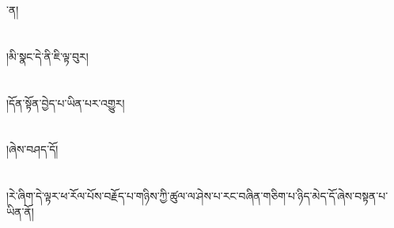་ན།\chapter{ }།མི་སྣང་དེ་ནི་ཇི་ལྟ་བུར།\chapter{ }།དོན་སྟོན་བྱེད་པ་ཡིན་པར་འགྱུར།\chapter{ }།ཞེས་བཤད་དོ།\chapter{ }།རེ་ཞིག་དེ་ལྟར་ཕ་རོལ་པོས་བརྗོད་པ་གཉིས་ཀྱི་ཚུལ་ལ་ཤེས་པ་རང་བཞིན་གཅིག་པ་ཉིད་མེད་དོ་ཞེས་བསྟན་པ་ཡིན་ནོ།\chap